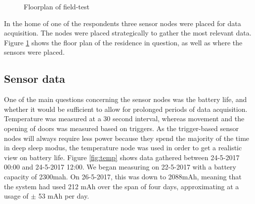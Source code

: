 \documentclass{below-ext}
\begin{document}
\begin{figure}
\caption{Floorplan of field-test}
\label{fig:floorplan}
\end{figure}
In the home of one of the respondents three sensor nodes were placed for data acquisition. The nodes were placed strategically to gather the most relevant data. Figure \ref{fig:floorplan} shows the floor plan of the residence in question, as well as where the sensors were placed.

\subsection{Sensor data}
One of the main questions concerning the sensor nodes was the battery life, and whether it would be sufficient to allow for prolonged periods of data acquisition. Temperature was measured at a 30 second interval, whereas movement and the opening of doors was measured based on triggers. As the trigger-based sensor nodes will always require less power because they spend the majority of the time in deep sleep modus, the temperature node was used in order to get a realistic view on battery life. Figure  \ref{fig:temp} shows data gathered between 24-5-2017 00:00 and 24-5-2017 12:00. We began measuring on 22-5-2017 with a battery capacity of 2300mah. On 26-5-2017, this was down to 2088mAh, meaning that the system had used 212 mAh over the span of four days, approximating at a usage of  $\pm$ 53 mAh per day.
\end{document}
